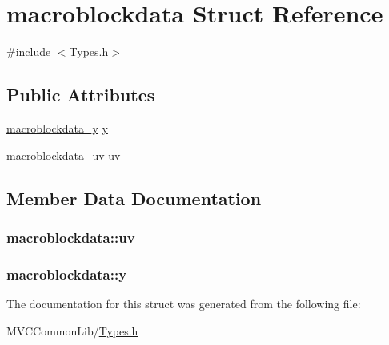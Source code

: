 \hypertarget{structmacroblockdata}{
\section{macroblockdata Struct Reference}
\label{structmacroblockdata}
}


{\ttfamily \#include $<$Types.h$>$}

\subsection*{Public Attributes}
\begin{DoxyCompactItemize}
\item 
\hyperlink{_types_8h_a15eca744b460ea898a5e04df2899d49f}{macroblockdata\_\-y} \hyperlink{structmacroblockdata_ac3e45382bf0c21b9714fe7d8e9e1a12d}{y}
\item 
\hyperlink{_types_8h_abb0aad4f6cc5fb3beadf8f4df08da50f}{macroblockdata\_\-uv} \hyperlink{structmacroblockdata_a07e17343606921d436bfddef89d0d93f}{uv}
\end{DoxyCompactItemize}


\subsection{Member Data Documentation}
\hypertarget{structmacroblockdata_a07e17343606921d436bfddef89d0d93f}{
\subsubsection[{uv}]{ {\bf macroblockdata::uv}}}
\label{structmacroblockdata_a07e17343606921d436bfddef89d0d93f}
\hypertarget{structmacroblockdata_ac3e45382bf0c21b9714fe7d8e9e1a12d}{
\subsubsection[{y}]{ {\bf macroblockdata::y}}}
\label{structmacroblockdata_ac3e45382bf0c21b9714fe7d8e9e1a12d}


The documentation for this struct was generated from the following file:\begin{DoxyCompactItemize}
\item 
MVCCommonLib/\hyperlink{_types_8h}{Types.h}\end{DoxyCompactItemize}
